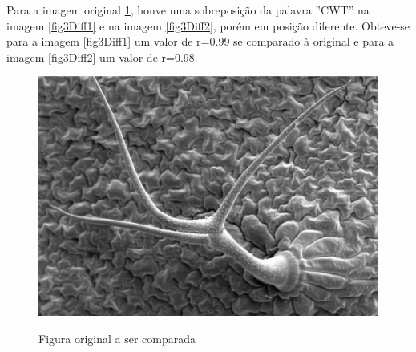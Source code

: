 \documentclass[10pt,a4paper]{article}
\begin{document}
\newpage

Para a imagem original \ref{fig3}, houve uma sobreposição da palavra
''CWT'' na imagem \ref{fig3Diff1} e na imagem \ref{fig3Diff2},
porém em posição diferente. Obteve-se para a imagem \ref{fig3Diff1}
um valor de r=0.99 se comparado à original e para a imagem \ref{fig3Diff2} 
um valor de r=0.98.
\begin{figure}[h!]
\begin{center}
\includegraphics[scale=0.35]{photos/m15_tricome}\label{fig3}
\caption{Figura original a ser comparada}
\end{center}
\end{figure}
\end{document}
